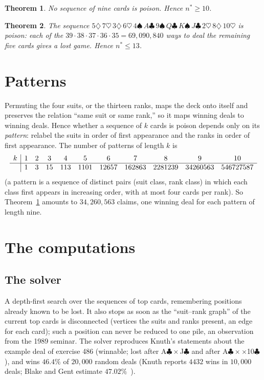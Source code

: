 \documentclass[11pt]{amsart}
\newtheorem{theorem}{Theorem}
\theoremstyle{remark}
\newcommand{\Sp}{\spadesuit}\newcommand{\He}{\heartsuit}\newcommand{\Di}{\diamondsuit}\newcommand{\Cl}{\clubsuit}
\begin{document}
\begin{theorem}\label{thm:nine}
No sequence of nine cards is poison. Hence $n^*\ge10$.
\end{theorem}

\begin{theorem}\label{thm:fourteen}
The sequence $5\Di\,7\He\,3\Di\,6\He\,4\Sp\,A\Cl\,9\Sp\,Q\Cl\,K\Sp\,J\Cl\,2\He\,8\Di\,10\He$ is poison: each of the
$39\cdot38\cdot37\cdot36\cdot35=69{,}090{,}840$ ways to deal the remaining five cards gives a lost game. Hence
$n^*\le13$.
\end{theorem}

\section{Patterns}
Permuting the four suits, or the thirteen ranks, maps the deck onto itself and preserves the relation ``same suit or
same rank,'' so it maps winning deals to winning deals. Hence whether a sequence of $k$ cards is poison depends only
on its \emph{pattern}: relabel the suits in order of first appearance and the ranks in order of first appearance. The
number of patterns of length $k$ is
\[
\begin{array}{c|cccccccccc}
k&1&2&3&4&5&6&7&8&9&10\\\hline
&1&3&15&113&1101&12657&162863&2281239&34260563&546727587
\end{array}
\]
(a pattern is a sequence of distinct pairs (suit class, rank class) in which each class first appears in increasing
order, with at most four cards per rank). So Theorem~\ref{thm:nine} amounts to $34{,}260{,}563$ claims, one winning
deal for each pattern of length nine.

\section{The computations}
\subsection*{The solver} A depth-first search over the sequences of top cards, remembering positions already known to
be lost. It also stops as soon as the ``suit--rank graph'' of the current top cards is disconnected (vertices the
suits and ranks present, an edge for each card); such a position can never be reduced to one pile, an observation
from the 1989 seminar. The solver reproduces Knuth's statements about the example deal of exercise 486 (winnable;
lost after A$\Cl\times$J$\Cl$ and after A$\Cl\times\times$10$\Cl$), and wins $46.4\%$ of $20{,}000$ random deals
(Knuth reports $4432$ wins in $10{,}000$ deals; Blake and Gent estimate $47.02\%$~\cite{gent}).
\end{document}
